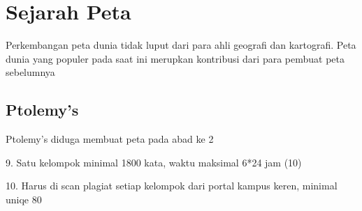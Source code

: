 	\section{Sejarah Peta}
	Perkembangan peta dunia tidak luput dari para ahli geografi dan kartografi. Peta dunia yang populer pada saat ini merupkan kontribusi dari para 
	pembuat peta sebelumnya

	\subsection{Ptolemy's}
	Ptolemy's diduga membuat peta pada abad ke 2
	
9. Satu kelompok minimal 1800 kata, waktu maksimal 6*24 jam (10)

10. Harus di scan plagiat setiap kelompok dari portal kampus keren, minimal uniqe 80%

